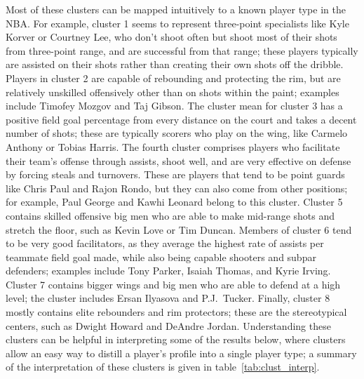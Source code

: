 Most of these clusters can be mapped intuitively to a known player type in the NBA.
For example, cluster 1 seems to represent three-point specialists like Kyle Korver
or Courtney Lee, who don't shoot often but shoot most of their shots from
three-point range, and are successful from that range; these players typically are
assisted on their shots rather than creating their own shots off the dribble.
Players in cluster 2 are capable of rebounding and protecting the rim, but are
relatively unskilled offensively other than on shots within the paint; examples
include Timofey Mozgov and Taj Gibson. The cluster mean for cluster 3 has a positive
field goal percentage from every distance on the court and takes a decent number of
shots; these are typically scorers who play on the wing, like Carmelo Anthony or
Tobias Harris. The fourth cluster comprises players who facilitate their team's
offense through assists, shoot well, and are very effective on defense by forcing
steals and turnovers. These are players that tend to be point guards like Chris Paul
and Rajon Rondo, but they can also come from other positions; for example, Paul
George and Kawhi Leonard belong to this cluster. Cluster 5 contains skilled
offensive big men who are able to make mid-range shots and stretch the floor, such
as Kevin Love or Tim Duncan. Members of cluster 6 tend to be very good facilitators,
as they average the highest rate of assists per teammate field goal made, while also
being capable shooters and subpar defenders; examples include Tony Parker, Isaiah
Thomas, and Kyrie Irving. Cluster 7 contains bigger wings and big men who are able
to defend at a high level; the cluster includes Ersan Ilyasova and P.J.\ Tucker.
Finally, cluster 8 mostly contains elite rebounders and rim protectors; these are
the stereotypical centers, such as Dwight Howard and DeAndre Jordan. Understanding
these clusters can be helpful in interpreting some of the results below, where
clusters allow an easy way to distill a player's profile into a single player type;
a summary of the interpretation of these clusters is given in
table~\ref{tab:clust_interp}.


